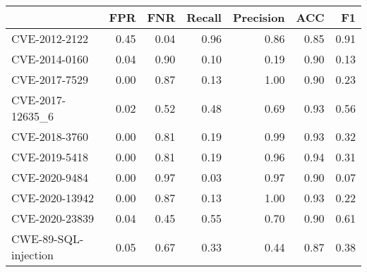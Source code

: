 \begin{tabular}{lrrrrrr}
\toprule
{} &  FPR &  FNR &  Recall &  Precision &  ACC &   F1 \\
\midrule
CVE-2012-2122        & 0.45 & 0.04 &    0.96 &       0.86 & 0.85 & 0.91 \\
CVE-2014-0160        & 0.04 & 0.90 &    0.10 &       0.19 & 0.90 & 0.13 \\
CVE-2017-7529        & 0.00 & 0.87 &    0.13 &       1.00 & 0.90 & 0.23 \\
CVE-2017-12635\_6     & 0.02 & 0.52 &    0.48 &       0.69 & 0.93 & 0.56 \\
CVE-2018-3760        & 0.00 & 0.81 &    0.19 &       0.99 & 0.93 & 0.32 \\
CVE-2019-5418        & 0.00 & 0.81 &    0.19 &       0.96 & 0.94 & 0.31 \\
CVE-2020-9484        & 0.00 & 0.97 &    0.03 &       0.97 & 0.90 & 0.07 \\
CVE-2020-13942       & 0.00 & 0.87 &    0.13 &       1.00 & 0.93 & 0.22 \\
CVE-2020-23839       & 0.04 & 0.45 &    0.55 &       0.70 & 0.90 & 0.61 \\
CWE-89-SQL-injection & 0.05 & 0.67 &    0.33 &       0.44 & 0.87 & 0.38 \\
\bottomrule
\end{tabular}
